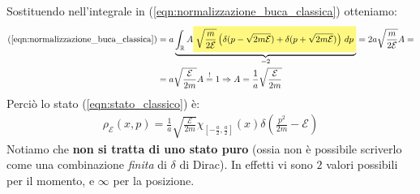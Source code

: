 \documentclass[../../FisicaTeorica.tex]{subfiles}
\begin{document}
Sostituendo nell'integrale in (\ref{eqn:normalizzazione_buca_classica}) otteniamo:
\begin{align*}
(\ref{eqn:normalizzazione_buca_classica}) &= a\underbrace{\int_\bb{R} A
\hlc{Yellow}{
\sqrt{\frac{m}{2\mathcal{E}}}\left(
\delta(p-\sqrt{2m\mathcal{E}})+\delta(p+\sqrt{2m\mathcal{E}})
\right)\,dp 
}
}_{=2} = 2a\sqrt{\frac{m}{2\mathcal{E}}}A =\\
&= a\sqrt{\frac{\mathcal{E}}{2m}}A\overset{!}{=}1\Rightarrow A=\frac{1}{a}\sqrt{\frac{\mathcal{E}}{2m}}
\end{align*}
Perciò lo stato (\ref{eqn:stato_classico}) è:
\begin{align}
\rho_\mathcal{E}(x,p)=\frac{1}{a} \sqrt{\frac{\mathcal{E}}{2m}}\chi_{\left[-\frac{a}{2},\frac{a}{2}\right]}(x)\delta\left(\frac{p^2}{2m}-\mathcal{E}\right)
\label{eqn:rhoEMC}
\end{align}
Notiamo che \textbf{non si tratta di uno stato puro} (ossia non è possibile scriverlo come una combinazione \textit{finita} di $\delta$ di Dirac). In effetti vi sono $2$ valori possibili per il momento, e $\infty$ per la posizione.\\
\end{document}
